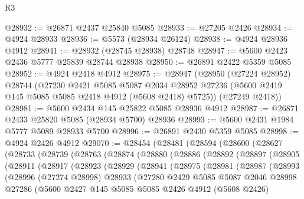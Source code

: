 \begin{lexlean}{R3}
\begin{coremodule}
@28932 := @26871 @2437 @25840 @5085
@28933 := @27205 @2426
@28934 := @4924 @28933
@28936 := @5573 (@28934 @26124)
@28938 := @4924 @28936 @4912
@28941 := @28932 (@28745 @28938) @28748
@28947 := @5600 @2423 @2436 @5777 @25839 @28744 @28938
@28950 := @26891 @2422 @5359 @5085
@28952 := @4924 @2418 @4912
@28975 := @28947
    (@28950
      (@27224 @28952)
      @28744
      (@27230
        @2421
        @5085
        @5087
        @2034
        @28952
        @27236
        (@5600 @2419 @145 @5085 @5085 @2418 @4912 (@5608 @2418) @5725))
      (@27249 @2418))
@28981 := @5600 @2434 @145 @25822 @5085 @28936 @4912
@28987 := @26871 @2433 @25820 @5085 (@28934 @5700) @28936
@28993 := @5600 @2431 @1984 @5777 @5089 @28933 @5700
@28996 := @26891 @2430 @5359 @5085
@28998 := @4924 @2426 @4912
@29070 := @28454
    (@28481
      (@28594
        (@28600
          (@28627
            (@28733
              (@28739
                (@28763
                  (@28874
                    (@28880
                      (@28886
                        (@28892
                          (@28897
                            (@28905
                              (@28911
                                (@28917
                                  (@28923
                                    (@28929
                                      (@28941
                                        (@28975
                                          (@28981
                                            (@28987
                                              (@28993
                                                (@28996
                                                  (@27274 @28998)
                                                  @28933
                                                  (@27280
                                                    @2429
                                                    @5085
                                                    @5087
                                                    @2046
                                                    @28998
                                                    @27286
                                                    (@5600
                                                      @2427
                                                      @145
                                                      @5085
                                                      @5085
                                                      @2426
                                                      @4912
                                                      (@5608 @2426)

\end{coremodule}
\end{lexlean}
